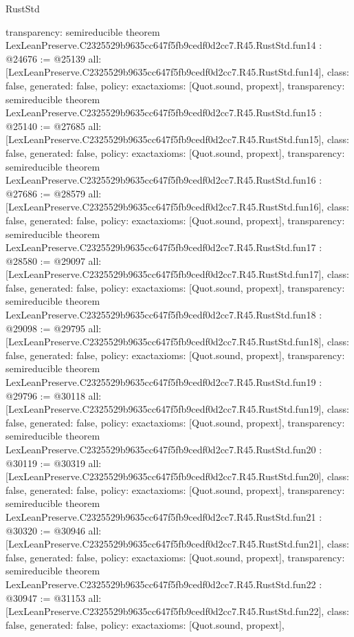 \begin{lexlean}{RustStd}
\begin{coremodule}
{  transparency: semireducible
}
theorem LexLeanPreserve.C2325529b9635cc647f5fb9cedf0d2cc7.R45.RustStd.fun14 : @24676 := @25139 {
  all: [LexLeanPreserve.C2325529b9635cc647f5fb9cedf0d2cc7.R45.RustStd.fun14],
  class: false,
  generated: false,
  policy: exact{axioms: [Quot.sound, propext]},
  transparency: semireducible
}
theorem LexLeanPreserve.C2325529b9635cc647f5fb9cedf0d2cc7.R45.RustStd.fun15 : @25140 := @27685 {
  all: [LexLeanPreserve.C2325529b9635cc647f5fb9cedf0d2cc7.R45.RustStd.fun15],
  class: false,
  generated: false,
  policy: exact{axioms: [Quot.sound, propext]},
  transparency: semireducible
}
theorem LexLeanPreserve.C2325529b9635cc647f5fb9cedf0d2cc7.R45.RustStd.fun16 : @27686 := @28579 {
  all: [LexLeanPreserve.C2325529b9635cc647f5fb9cedf0d2cc7.R45.RustStd.fun16],
  class: false,
  generated: false,
  policy: exact{axioms: [Quot.sound, propext]},
  transparency: semireducible
}
theorem LexLeanPreserve.C2325529b9635cc647f5fb9cedf0d2cc7.R45.RustStd.fun17 : @28580 := @29097 {
  all: [LexLeanPreserve.C2325529b9635cc647f5fb9cedf0d2cc7.R45.RustStd.fun17],
  class: false,
  generated: false,
  policy: exact{axioms: [Quot.sound, propext]},
  transparency: semireducible
}
theorem LexLeanPreserve.C2325529b9635cc647f5fb9cedf0d2cc7.R45.RustStd.fun18 : @29098 := @29795 {
  all: [LexLeanPreserve.C2325529b9635cc647f5fb9cedf0d2cc7.R45.RustStd.fun18],
  class: false,
  generated: false,
  policy: exact{axioms: [Quot.sound, propext]},
  transparency: semireducible
}
theorem LexLeanPreserve.C2325529b9635cc647f5fb9cedf0d2cc7.R45.RustStd.fun19 : @29796 := @30118 {
  all: [LexLeanPreserve.C2325529b9635cc647f5fb9cedf0d2cc7.R45.RustStd.fun19],
  class: false,
  generated: false,
  policy: exact{axioms: [Quot.sound, propext]},
  transparency: semireducible
}
theorem LexLeanPreserve.C2325529b9635cc647f5fb9cedf0d2cc7.R45.RustStd.fun20 : @30119 := @30319 {
  all: [LexLeanPreserve.C2325529b9635cc647f5fb9cedf0d2cc7.R45.RustStd.fun20],
  class: false,
  generated: false,
  policy: exact{axioms: [Quot.sound, propext]},
  transparency: semireducible
}
theorem LexLeanPreserve.C2325529b9635cc647f5fb9cedf0d2cc7.R45.RustStd.fun21 : @30320 := @30946 {
  all: [LexLeanPreserve.C2325529b9635cc647f5fb9cedf0d2cc7.R45.RustStd.fun21],
  class: false,
  generated: false,
  policy: exact{axioms: [Quot.sound, propext]},
  transparency: semireducible
}
theorem LexLeanPreserve.C2325529b9635cc647f5fb9cedf0d2cc7.R45.RustStd.fun22 : @30947 := @31153 {
  all: [LexLeanPreserve.C2325529b9635cc647f5fb9cedf0d2cc7.R45.RustStd.fun22],
  class: false,
  generated: false,
  policy: exact{axioms: [Quot.sound, propext]},
}
\end{coremodule}
\end{lexlean}
